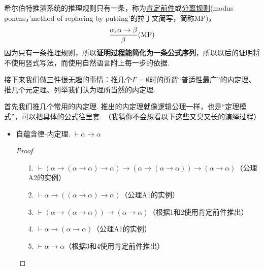 \documentclass[main.tex]{subfiles}
\begin{document}
希尔伯特推演系统的推理规则只有一条，称为\uline{肯定前件}或\uline{分离规则}(modus ponens，'method of replacing by putting'的拉丁文简写，简称MP)，
\[{\alpha, \alpha \to \beta \over \beta}({\rm MP})\]
因为只有一条推理规则，所以\textbf{证明过程能简化为一条公式序列}，所以以后的证明将不使用竖式写法，而使用自然语言附上每一步的依据.

接下来我们做三件很无趣的事情：推几个\(\Gamma=\emptyset\)时的所谓“普适性最广”的内定理、推几个元定理、列举我们认为理所当然的内定理.


首先我们推几个常用的内定理. 推出的内定理就像逻辑公理一样，也是“定理模式”，可以把具体的公式往里套. （我猜你不会想看以下这些又臭又长的演绎过程）
\begin{itemize}

    \item 自蕴含律-内定理. \(\vdash \alpha \to \alpha\)
    \begin{proof}
        \begin{itemize}
            \item [1.] \(\vdash (\alpha \to (\alpha \to \alpha) \to \alpha) \to (\alpha \to (\alpha \to \alpha)) \to (\alpha \to \alpha)\)（公理A2的实例）
            \item [2.] \(\vdash \alpha \to ((\alpha \to \alpha) \to \alpha)\)（公理A1的实例）
            \item [3.] \(\vdash (\alpha \to (\alpha \to \alpha)) \to (\alpha \to \alpha)\)（根据1和2使用肯定前件推出）
            \item [4.] \(\vdash \alpha \to (\alpha \to \alpha)\)（公理A1的实例）
            \item [5.] \(\vdash \alpha \to \alpha\)（根据3和4使用肯定前件推出）
        \end{itemize}
    \end{proof}


\end{itemize}
\end{document}
